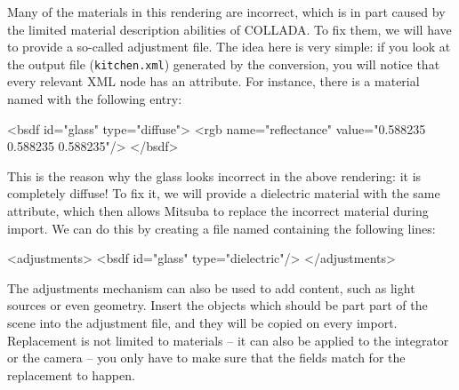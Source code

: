 \begin{center}
\end{center}
Many of the materials in this rendering are incorrect, which is in part caused by the limited material description abilities of COLLADA.
To fix them, we will have to provide a so-called adjustment file. The idea here is very simple: if you look at the output file (\texttt{kitchen.xml}) 
generated by the conversion, you will notice that every relevant XML node has an  attribute. For instance, there is a material named  with the following entry:
\begin{xml}
<bsdf id="glass" type="diffuse">
	<rgb name="reflectance" value="0.588235 0.588235 0.588235"/>
</bsdf>
\end{xml}
\newpage
This is the reason why the glass looks incorrect in the above rendering: it is completely diffuse!
To fix it, we will provide a dielectric material with the same  attribute, which then allows Mitsuba
to replace the incorrect material during import.
We can do this by creating a file named  containing
the following lines:
\begin{xml}
<adjustments>
	<bsdf id="glass" type="dielectric"/>
</adjustments>
\end{xml}
The adjustments mechanism can also be used to add content, such as light sources or even geometry. Insert the objects which should
be part part of the scene into the adjustment file, and they will be copied on every import. Replacement is not limited to materials -- it
can also be applied to the integrator or the camera -- you only have to make sure that the  fields match for the replacement to happen.

